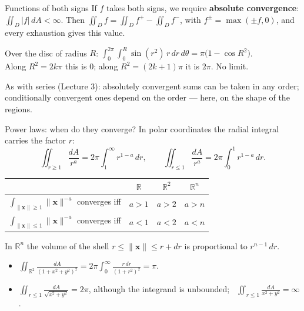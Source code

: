 \documentclass[10pt]{wosm-slides}
\newcommand{\R}{\mathbb{R}}
\newcommand{\dA}{\, dA}
\newcommand{\norm}[1]{\lVert #1 \rVert}
\newcommand{\vx}{\mathbf{x}}
\begin{document}
\begin{frame}{Functions of both signs}
  If $f$ takes both signs, we require \textbf{absolute convergence}: $\iint_D |f| \dA < \infty$. Then
  $\iint_D f = \iint_D f^+ - \iint_D f^-$, with $f^{\pm} = \max(\pm f, 0)$, and every exhaustion gives
  this value.
  \pause
  \begin{example}[$f = \sin(x^2 + y^2)$ on $\R^2$]
    Over the disc of radius $R$:
    $\displaystyle \int_0^{2\pi} \int_0^R \sin(r^2)\, r\, dr\, d\theta = \pi\bigl(1 - \cos R^2\bigr)$.
    \\[0.2em]
    Along $R^2 = 2k\pi$ this is $0$; along $R^2 = (2k + 1)\pi$ it is $2\pi$. No limit.
  \end{example}
  \pause
  {\small As with series (Lecture 3): absolutely convergent sums can be taken in any order;
  conditionally convergent ones depend on the order --- here, on the shape of the regions.\par}
\end{frame}

\begin{frame}{Power laws: when do they converge?}
  In polar coordinates the radial integral carries the factor $r$:
  \[ \iint_{r \ge 1} \frac{dA}{r^a} = 2\pi \int_1^\infty r^{1 - a}\, dr, \qquad
     \iint_{r \le 1} \frac{dA}{r^a} = 2\pi \int_0^1 r^{1 - a}\, dr . \]
  \pause
  \begin{center}
    \begin{tabular}{lccc}
      \toprule
      & $\R$ & $\R^2$ & $\R^n$ \\
      \midrule
      $\int_{\norm{\vx} \ge 1} \norm{\vx}^{-a}$ converges iff & $a > 1$ & $a > 2$ & $a > n$ \\
      $\int_{\norm{\vx} \le 1} \norm{\vx}^{-a}$ converges iff & $a < 1$ & $a < 2$ & $a < n$ \\
      \bottomrule
    \end{tabular}
  \end{center}
  {\small In $\R^n$ the volume of the shell $r \le \norm{\vx} \le r + dr$ is proportional to $r^{n-1}\, dr$.\par}
  \pause
  \begin{itemize}
    \item $\iint_{\R^2} \frac{dA}{(1 + x^2 + y^2)^2} = 2\pi \int_0^\infty \frac{r\, dr}{(1 + r^2)^2} = \pi$.
    \item $\iint_{r \le 1} \frac{dA}{\sqrt{x^2 + y^2}} = 2\pi$, although the integrand is unbounded; \
      $\iint_{r \le 1} \frac{dA}{x^2 + y^2} = \infty$.
  \end{itemize}
\end{frame}
\end{document}
